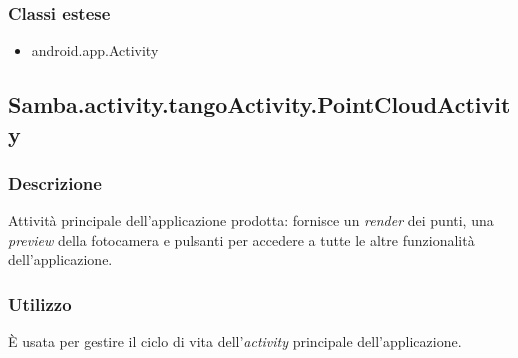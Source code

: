 \subsubsection{Classi estese}
\begin{itemize}
	\item android.app.Activity
\end{itemize}

\subsection{Samba.activity.tangoActivity.PointCloudActivity}\label{comp:Samba.activity.tangoActivity.PointCloudActivity}
\subsubsection{Descrizione}
Attività principale dell'applicazione prodotta: fornisce un \emph{render} dei punti, una \emph{preview} della fotocamera e pulsanti per accedere a tutte le altre funzionalità dell'applicazione.\\
\subsubsection{Utilizzo}
È usata per gestire il ciclo di vita dell'\emph{activity} principale dell'applicazione.
